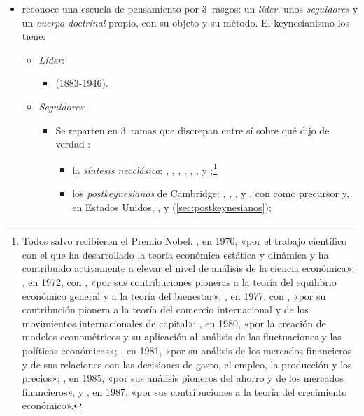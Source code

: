 \documentclass[11pt]{article}
\begin{document}
\begin{itemize}
\item {} reconoce una escuela de pensamiento por 3~rasgos: un \emph{líder}, unos \emph{seguidores} y un \emph{cuerpo doctrinal} propio, con su objeto y su método\nocite{Schumpeter1954History}. El keynesianismo los tiene:
  \begin{itemize}
  \item \emph{Líder}:
    \begin{itemize}
    \item {} (1883-1946).
    \end{itemize}
  \item \emph{Seguidores}:
    \begin{itemize}
    \item Se reparten en 3~ramas que discrepan entre sí sobre qué dijo de verdad :
    \begin{itemize}
    \item la \emph{síntesis neoclásica}: , , , , , ,  y  ;\footnote{Todos salvo  recibieron el Premio Nobel\nocite{Nobel2026Economia}: , en 1970, «por el trabajo científico con el que ha desarrollado la teoría económica estática y dinámica y ha contribuido activamente a elevar el nivel de análisis de la ciencia económica»; , en 1972, con , «por sus contribuciones pioneras a la teoría del equilibrio económico general y a la teoría del bienestar»; , en 1977, con , «por su contribución pionera a la teoría del comercio internacional y de los movimientos internacionales de capital»; , en 1980, «por la creación de modelos econométricos y su aplicación al análisis de las fluctuaciones y las políticas económicas»; , en 1981, «por su análisis de los mercados financieros y de sus relaciones con las decisiones de gasto, el empleo, la producción y los precios»; , en 1985, «por sus análisis pioneros del ahorro y de los mercados financieros», y , en 1987, «por sus contribuciones a la teoría del crecimiento económico»\nocite{Nobel1970Samuelson,Nobel1972HicksArrow,Nobel1977MeadeOhlin,Nobel1980Klein,Nobel1981Tobin,Nobel1985Modigliani,Nobel1987Solow}.}
    \item los \emph{postkeynesianos} de Cambridge: , , ,  y , con  como precursor y, en Estados Unidos, ,  y  (\ref{sec:postkeynesianos});

\end{itemize}
\end{itemize}
\end{itemize}
\end{itemize}
\end{document}
